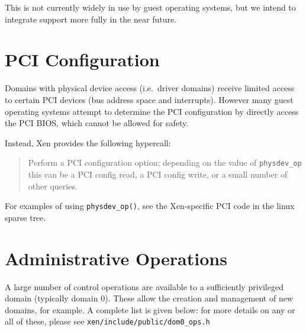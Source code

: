 \documentclass[11pt,twoside,final,openright]{report}
\begin{document}
This is not currently widely in use by guest operating systems, but 
we intend to integrate support more fully in the near future. 

\section{PCI Configuration} 

Domains with physical device access (i.e.\ driver domains) receive
limited access to certain PCI devices (bus address space and
interrupts). However many guest operating systems attempt to 
determine the PCI configuration by directly access the PCI BIOS, 
which cannot be allowed for safety. 

Instead, Xen provides the following hypercall: 

\begin{quote}

Perform a PCI configuration option; depending on the value 
of {\tt physdev\_op} this can be a PCI config read, a PCI config 
write, or a small number of other queries. 

\end{quote} 


For examples of using {\tt physdev\_op()}, see the 
Xen-specific PCI code in the linux sparse tree. 

\section{Administrative Operations}
\label{s:dom0ops}

A large number of control operations are available to a sufficiently
privileged domain (typically domain 0). These allow the creation and
management of new domains, for example. A complete list is given 
below: for more details on any or all of these, please see 
{\tt xen/include/public/dom0\_ops.h} 
\end{document}
